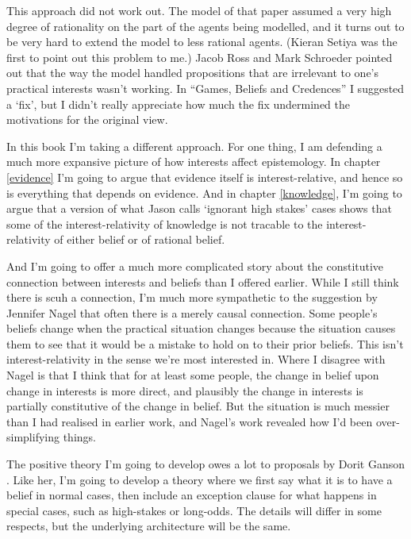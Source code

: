 \documentclass[11pt,]{book}
\begin{document}
This approach did not work out. The model of that paper assumed a very high degree of rationality on the part of the agents being modelled, and it turns out to be very hard to extend the model to less rational agents. (Kieran Setiya was the first to point out this problem to me.) Jacob Ross and Mark Schroeder \citeyearpar{RossSchroeder2014} pointed out that the way the model handled propositions that are irrelevant to one's practical interests wasn't working. In ``Games, Beliefs and Credences'' I suggested a `fix', but I didn't really appreciate how much the fix undermined the motivations for the original view.

In this book I'm taking a different approach. For one thing, I am defending a much more expansive picture of how interests affect epistemology. In chapter \ref{evidence} I'm going to argue that evidence itself is interest-relative, and hence so is everything that depends on evidence. And in chapter \ref{knowledge}, I'm going to argue that a version of what Jason \citet{Stanley2005} calls `ignorant high stakes' cases shows that some of the interest-relativity of knowledge is not tracable to the interest-relativity of either belief or of rational belief.

And I'm going to offer a much more complicated story about the constitutive connection between interests and beliefs than I offered earlier. While I still think there is scuh a connection, I'm much more sympathetic to the suggestion by Jennifer Nagel \citetext{\citeyear{Nagel2008}; \citeyear{Nagel2010}} that often there is a merely causal connection. Some people's beliefs change when the practical situation changes because the situation causes them to see that it would be a mistake to hold on to their prior beliefs. This isn't interest-relativity in the sense we're most interested in. Where I disagree with Nagel is that I think that for at least some people, the change in belief upon change in interests is more direct, and plausibly the change in interests is partially constitutive of the change in belief. But the situation is much messier than I had realised in earlier work, and Nagel's work revealed how I'd been over-simplifying things.

The positive theory I'm going to develop owes a lot to proposals by Dorit Ganson \citetext{\citeyear{Ganson2008}; \citeyear{Ganson2019}}. Like her, I'm going to develop a theory where we first say what it is to have a belief in normal cases, then include an exception clause for what happens in special cases, such as high-stakes or long-odds. The details will differ in some respects, but the underlying architecture will be the same.
\end{document}
